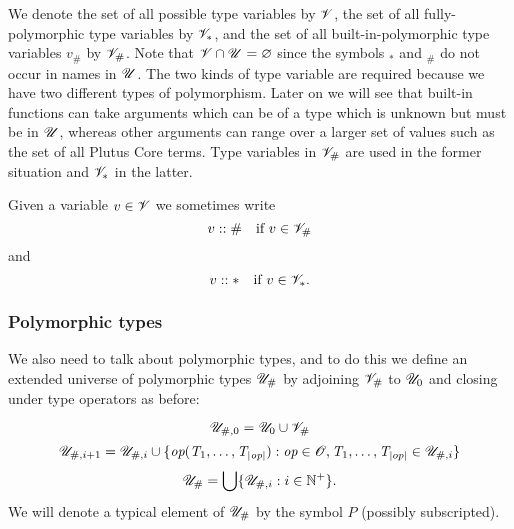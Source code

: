 \medskip
\noindent
We denote the set of all possible type variables by $\mathscr{V}$, the set of all
fully-polymorphic type variables by $\mathscr{V}_*$, and the set of all
built-in-polymorphic type variables $v_\#$ by $\mathscr{V}_\#$.  Note that $\mathscr{V} \cap
\mathscr{U} = \varnothing$ since the symbols ${}_*$ and ${}_\#$ do not occur in names in $\mathscr{U}$.%
%
%
%
%
The two kinds of type variable are required because we have two different types
of polymorphism. Later on we will see that built-in functions can take arguments
which can be of a type which is unknown but must be in $\mathscr{U}$, whereas other
arguments can range over a larger set of values such as the set of all Plutus
Core terms. Type variables in $\mathscr{V}_\#$ are used in the former situation and
$\mathscr{V}_*$ in the latter.

Given a variable $v \in \mathscr{V}$ we sometimes write
$$
   v::\text{\#} \text{\quad if $v \in \mathscr{V}_\#$}
$$
and
$$
   \kindstar{v} \text{\quad if $v \in \Var_*$}.
$$
   

\subsubsection{Polymorphic types}
\label{sec:polymorphic-types}
We also need to talk about polymorphic types, and to do this we define an
extended universe of polymorphic types ${\mathscr{U}_{\#}}$ by adjoining $\mathscr{V}_\#$ to
$\mathscr{U}_0$ and closing under type operators as before:

$$
\mathscr{U}_{\#,0} = \mathscr{U}_0 \cup \mathscr{V}_\#
$$
$$
\mathscr{U}_{\#,i+1} = \mathscr{U}_{\#,i} \cup \{\textit{op}(\textit{T}_1, \ldots, \textit{T}_{\left| \textit{op} \right|}): \textit{op} \in \mathscr{O}, \textit{T}_1, \ldots, \textit{T}_{\left| op \right|} \in \mathscr{U}_{\#,i}\}
$$
$$
{\mathscr{U}_{\#}} = \bigcup\{\mathscr{U}_{\#,i}: i \in \mathbb{N}^{+}\}.$$%
%
\noindent We will denote a typical element of ${\mathscr{U}_{\#}}$ by the symbol $P$
(possibly subscripted).%


